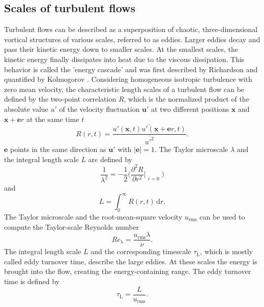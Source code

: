 \documentclass[11pt,a4paper,openany,oneside,parskip=half*]{article}
\renewcommand*\vec[1]{\boldsymbol{#1}}
\begin{document}
\subsection{Scales of turbulent flows}
Turbulent flows can be described as a superposition of chaotic, three-dimensional vortical structures of various scales, referred to as eddies. Larger eddies decay and pass their kinetic energy down to smaller scales. At the smallest scales, the kinetic energy finally dissipates into heat due to the viscous dissipation. This behavior is called the 'energy cascade' and was first described by Richardson \cite{Richardson1920} and quantified by Kolmogorov \cite{Kolmogorov1941}.
\newline
Considering homogeneous isotropic turbulence with zero mean velocity, the characteristic length scales of a turbulent flow can be defined by the two-point correlation $R$, which is the normalized product of the absolute value $u'$ of the velocity fluctuation $\vec{u}'$ at two different positions 
$\vec{x}$ and $\vec{x} + \vec{e}r$ at the same time $t$
\begin{equation}
R (r, t) = \frac{\overline{u'(\vec{x}, t)u'(\vec{x} + \vec{e}r, t)}}{\overline{u'^2}}.
\end{equation}
$\vec{e}$ points in the same direction as $\vec{u}'$ with $|\vec{e}| = 1$.
The Taylor microscale $\lambda$ and the integral length scale $L$ are defined by
\begin{equation}
 \frac{1}{\lambda^2} = -\frac{1}{2}\biggl(\frac{\partial^2 R}{\partial r^2}\Bigr|_{\substack{r=0}}\biggl)
\end{equation}
and
\begin{equation} \label{eq:integralLengthScale}
L = \int_{0}^{\infty} R (r, t)  \, \mathrm{d}r.
\end{equation}
\newline
The Taylor microscale and the root-mean-square velocity $u_{\mathrm{rms}}$ can be used to compute the Taylor-scale Reynolds number
\begin{equation}
Re_\mathrm{\lambda} = \frac{u_{\mathrm{rms}} \lambda}{\nu}.
\end{equation}
\newline
The integral length scale $L$ and the corresponding timescale $\tau_\mathrm{L}$, which is mostly called eddy turnover time, describe the large eddies. At these scales the energy is brought into the flow, creating the energy-containing range. The eddy turnover time is defined by
\begin{equation}
\tau_\mathrm{L} = \frac{L}{u_{\mathrm{rms}}}.
\end{equation}
\end{document}
